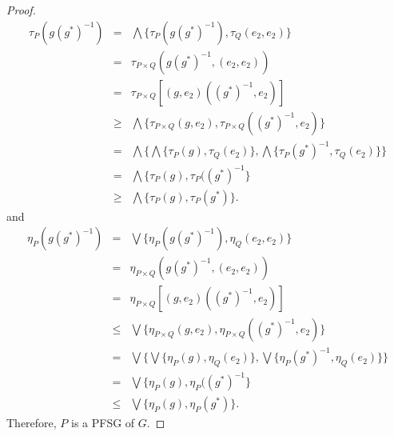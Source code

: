 \documentclass[10pt,a4paper]{amsart}
\begin{document}
\begin{proof}
\begin{eqnarray*}
\tau_P(g (g^*)^{-1}) & = & \bigwedge \lbrace \tau_P(g (g^*)^{-1}), \tau_Q(e_2, e_2) \rbrace\\
& = & \tau_{P \times Q}(g (g^*)^{-1}, (e_2, e_2))\\
& = & \tau_{P \times Q}[(g, e_2)((g^*)^{-1}, e_2)]\\
& \geq & \bigwedge \lbrace \tau_{P \times Q}(g, e_2), \tau_{P \times Q}((g^*)^{-1}, e_2) \rbrace\\
& = & \bigwedge \lbrace \bigwedge\lbrace \tau_P(g), \tau_Q(e_2)\rbrace, \bigwedge\lbrace \tau_P(g^*)^{-1}, \tau_Q(e_2) \rbrace \rbrace\\
& = & \bigwedge\lbrace \tau_P(g), \tau_P((g^*)^{-1} \rbrace\\
& \geq & \bigwedge\lbrace \tau_P(g), \tau_P(g^*) \rbrace. 
\end{eqnarray*}
and
\begin{eqnarray*}
\eta_P(g (g^*)^{-1}) & = & \bigvee \lbrace \eta_P(g (g^*)^{-1}), \eta_Q(e_2, e_2) \rbrace\\
& = & \eta_{P \times Q}(g (g^*)^{-1}, (e_2, e_2))\\
& = & \eta_{P \times Q}[(g, e_2)((g^*)^{-1}, e_2)]\\
& \leq & \bigvee \lbrace \eta_{P \times Q}(g, e_2), \eta_{P \times Q}((g^*)^{-1}, e_2) \rbrace\\
& = & \bigvee \lbrace \bigvee\lbrace \eta_P(g), \eta_Q(e_2)\rbrace, \bigvee\lbrace \eta_P(g^*)^{-1}, \eta_Q(e_2) \rbrace \rbrace\\
& = & \bigvee\lbrace \eta_P(g), \eta_P((g^*)^{-1} \rbrace\\
& \leq & \bigvee\lbrace \eta_P(g), \eta_P(g^*) \rbrace. 
\end{eqnarray*}
Therefore, $P$ is a PFSG of $G.$
\end{proof}
\end{document}
